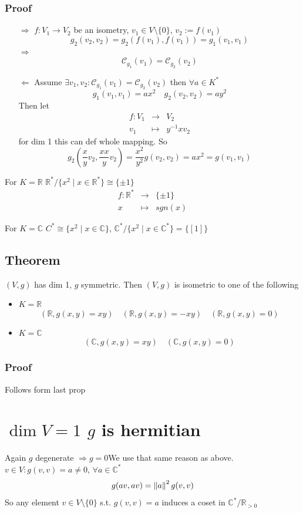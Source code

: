 \documentclass{book}
\begin{document}
\subsubsection*{Proof}
\begin{itemize}
    \item[$\Rightarrow$] $f:V_1\rightarrow V_2$ be an isometry, $v_1\in V\setminus\{0\}$, $v_2:=f(v_1)$
    $$g_2(v_2,v_2)=g_2(f(v_1),f(v_1))=g_1(v_1,v_1)$$
    $\Rightarrow$
    $$\mathcal{C}_{g_1}(v_1)=\mathcal{C}_{g_2}(v_2)$$
    \item[$\Leftarrow$] Assume $\exists v_1,v_2:\mathcal{C}_{g_1}(v_1)=\mathcal{C}_{g_2}(v_2)$ then $\forall a\in K^*$$$g_1(v_1,v_1)=ax^2\quad g_2(v_2,v_2)=ay^2$$
    Then let$$\begin{aligned}
        f:V_1&\rightarrow&V_2\\
        v_1&\mapsto&y^{-1}xv_2
    \end{aligned}$$
    for dim 1 this can def whole mapping. So
    $$g_2(\frac{x}{y}v_2,\frac{xx}{y}v_2)=\frac{x^2}{y^2}g(v_2,v_2)=ax^2=g(v_1,v_1)$$
\end{itemize}

For $K=\mathbb{R}$ $\mathbb{R}^*/\{x^2\mid x\in \mathbb{R}^*\}\cong\{\pm1\}$$$\begin{aligned}
    f:\mathbb{R}^*&\rightarrow&\{\pm1\}\\x&\mapsto&sgn(x)
\end{aligned}$$

For $K=\mathbb{C}$ $C^*\cong\{x^2\mid x\in\mathbb{C}\}$, $\mathbb{C}^*/\{x^2\mid x\in\mathbb{C}^*\}=\{[1]\}$

\subsection{Theorem}
$(V,g)$ has dim 1, $g$ symmetric. Then $(V,g)$ is isometric to one of the following
\begin{itemize}
    \item $K=\mathbb{R}$$$(\mathbb{R},g(x,y)=xy)\quad(\mathbb{R},g(x,y)=-xy)\quad (\mathbb{R},g(x,y)=0)$$
    \item $K=\mathbb{C}$$$(\mathbb{C},g(x,y)=xy)\quad (\mathbb{C},g(x,y)=0)$$ 
\end{itemize}
\subsubsection*{Proof}Follows form last prop
\section{$\dim V=1$ $g$ is hermitian}
Again $g$ degenerate $\Rightarrow g=0$We use that same reason as above. $v\in V:g(v,v)=a\neq 0$, $\forall a\in \mathbb{C}^*$$$g(av,av)=\left\lVert a \right\rVert^2g(v,v)$$
So any element $v\in V\setminus\{0\}$ s.t. $g(v,v)=a$ induces a coset in $\mathbb{C}^*/\mathbb{R}_{> 0}$
\end{document}
